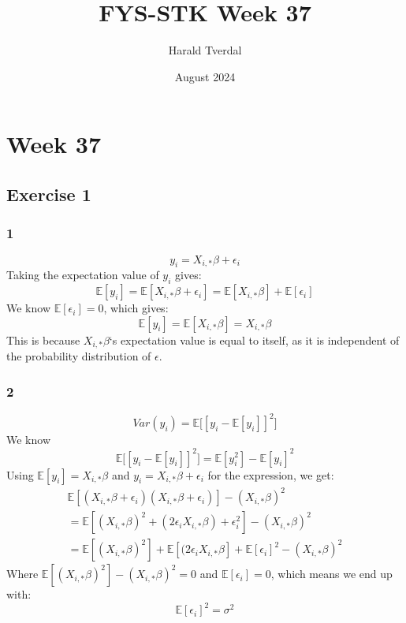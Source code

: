\documentclass{article}
\title{FYS-STK Week 37}
\author{Harald Tverdal}
\date{August 2024}
\begin{document}
\maketitle

\section{Week 37}
\subsection{Exercise 1}
\subsubsection{1}
\begin{equation}
    y_i = X_{i,*}\beta + \epsilon_i
\end{equation}
Taking the expectation value of $y_i$ gives:
\begin{equation}
    \mathbb{E}[y_i] = \mathbb{E}[X_{i,*}\beta + \epsilon_i] = \mathbb{E}[X_{i,*}\beta] + \mathbb{E}[\epsilon_i]
\end{equation}
We know $\mathbb{E}[\epsilon_i] = 0$, which gives:
\begin{equation}
    \mathbb{E}[y_i] = \mathbb{E}[X_{i,*}\beta] = X_{i,*}\beta
\end{equation}
This is because $X_{i,*}\beta$`s expectation value is equal to itself, as it is independent of the probability distribution of $\epsilon$.

\subsubsection{2}
\begin{equation}
    Var(y_i) = \mathbb{E}\Big[[y_i - \mathbb{E}[y_i]]^2\Big]
\end{equation}
We know 
\begin{equation}
    \mathbb{E}\Big[[y_i - \mathbb{E}[y_i]]^2\Big] = \mathbb{E}[y_i^2]-\mathbb{E}[y_i]^2
\end{equation}
Using $\mathbb{E}[y_i] = X_{i,*}\beta$ and $y_i = X_{i,*}\beta + \epsilon_i$ for the expression, we get:
\begin{equation}
    \begin{split}
        \mathbb{E}[(X_{i,*}\beta + \epsilon_i)(X_{i,*}\beta + \epsilon_i)] - (X_{i,*}\beta)^2\\
        = \mathbb{E}[(X_{i,*}\beta)^2 + (2\epsilon_iX_{i,*}\beta) + \epsilon_i^2] - (X_{i,*}\beta)^2\\
        = \mathbb{E}[(X_{i,*}\beta)^2] + \mathbb{E}[(2\epsilon_iX_{i,*}\beta] + \mathbb{E}[\epsilon_i]^2 - (X_{i,*}\beta)^2
    \end{split}
\end{equation}
Where $\mathbb{E}[(X_{i,*}\beta)^2] - (X_{i,*}\beta)^2 = 0$ and $\mathbb{E}[\epsilon_i] = 0$, which means we end up with:
\begin{equation}
    \mathbb{E}[\epsilon_i]^2 = \sigma^2
\end{equation}
\end{document}
